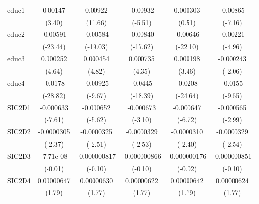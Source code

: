 \begin{table}[htbp]
\begin{tabular}{l*{5}{c}}
educ1       &     0.00147\sym{***}&     0.00922\sym{***}&    -0.00932\sym{***}&    0.000303         &    -0.00865\sym{***}\\
            &      (3.40)         &     (11.66)         &     (-5.51)         &      (0.51)         &     (-7.16)         \\
educ2       &    -0.00591\sym{***}&    -0.00584\sym{***}&    -0.00840\sym{***}&    -0.00646\sym{***}&    -0.00221\sym{***}\\
            &    (-23.44)         &    (-19.03)         &    (-17.62)         &    (-22.10)         &     (-4.96)         \\
educ3       &    0.000252\sym{***}&    0.000454\sym{***}&    0.000735\sym{***}&    0.000198\sym{***}&   -0.000243\sym{*}  \\
            &      (4.64)         &      (4.82)         &      (4.35)         &      (3.46)         &     (-2.06)         \\
educ4       &     -0.0178\sym{***}&    -0.00925\sym{***}&     -0.0445\sym{***}&     -0.0208\sym{***}&     -0.0155\sym{***}\\
            &    (-28.82)         &     (-9.67)         &    (-18.39)         &    (-24.64)         &     (-9.55)         \\
SIC2D1      &   -0.000633\sym{***}&   -0.000652\sym{***}&   -0.000673\sym{**} &   -0.000647\sym{***}&   -0.000565\sym{**} \\
            &     (-7.61)         &     (-5.62)         &     (-3.10)         &     (-6.72)         &     (-2.99)         \\
SIC2D2      &  -0.0000305\sym{*}  &  -0.0000325\sym{*}  &  -0.0000329\sym{*}  &  -0.0000310\sym{*}  &  -0.0000329\sym{*}  \\
            &     (-2.37)         &     (-2.51)         &     (-2.53)         &     (-2.40)         &     (-2.54)         \\
SIC2D3      &   -7.71e-08         &-0.000000817         &-0.000000866         &-0.000000176         &-0.000000851         \\
            &     (-0.01)         &     (-0.10)         &     (-0.10)         &     (-0.02)         &     (-0.10)         \\
SIC2D4      &  0.00000647         &  0.00000630         &  0.00000622         &  0.00000642         &  0.00000624         \\
            &      (1.79)         &      (1.77)         &      (1.77)         &      (1.79)         &      (1.77)         \\

\end{tabular}
\end{table}
